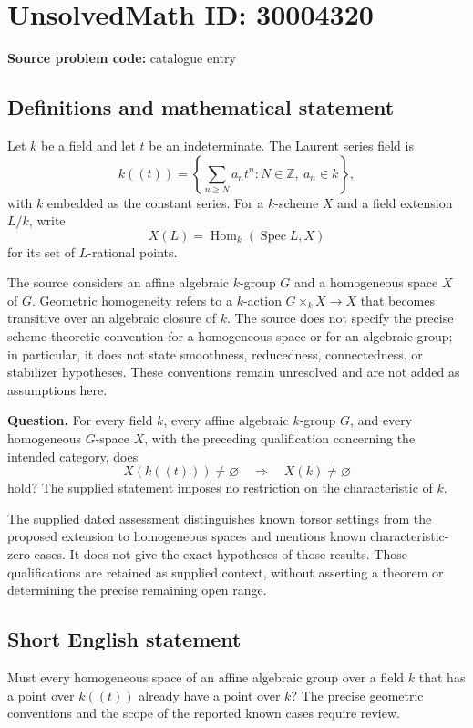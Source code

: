 \documentclass[11pt]{article}
\newcommand{\Z}{\mathbb{Z}}
\begin{document}
\section*{UnsolvedMath ID: 30004320}
\textbf{Source problem code:} catalogue entry
\subsection{Definitions and mathematical statement}
Let \(k\) be a field and let \(t\) be an indeterminate. The Laurent series field is
\[
k((t))=\left\{\sum_{n\geq N}a_nt^n : N\in\Z,\ a_n\in k\right\},
\]
with \(k\) embedded as the constant series. For a \(k\)-scheme \(X\) and a field extension \(L/k\), write
\[
X(L)=\operatorname{Hom}_k(\operatorname{Spec}L,X)
\]
for its set of \(L\)-rational points.

The source considers an affine algebraic \(k\)-group \(G\) and a homogeneous space \(X\) of \(G\). Geometric homogeneity refers to a \(k\)-action \(G\times_k X\to X\) that becomes transitive over an algebraic closure of \(k\). The source does not specify the precise scheme-theoretic convention for a homogeneous space or for an algebraic group; in particular, it does not state smoothness, reducedness, connectedness, or stabilizer hypotheses. These conventions remain unresolved and are not added as assumptions here.

\textbf{Question.} For every field \(k\), every affine algebraic \(k\)-group \(G\), and every homogeneous \(G\)-space \(X\), with the preceding qualification concerning the intended category, does
\[
X(k((t)))\neq\varnothing
\quad\Longrightarrow\quad
X(k)\neq\varnothing
\]
hold? The supplied statement imposes no restriction on the characteristic of \(k\).

The supplied dated assessment distinguishes known torsor settings from the proposed extension to homogeneous spaces and mentions known characteristic-zero cases. It does not give the exact hypotheses of those results. Those qualifications are retained as supplied context, without asserting a theorem or determining the precise remaining open range.
\subsection{Short English statement}
Must every homogeneous space of an affine algebraic group over a field \(k\) that has a point over \(k((t))\) already have a point over \(k\)? The precise geometric conventions and the scope of the reported known cases require review.
\end{document}
